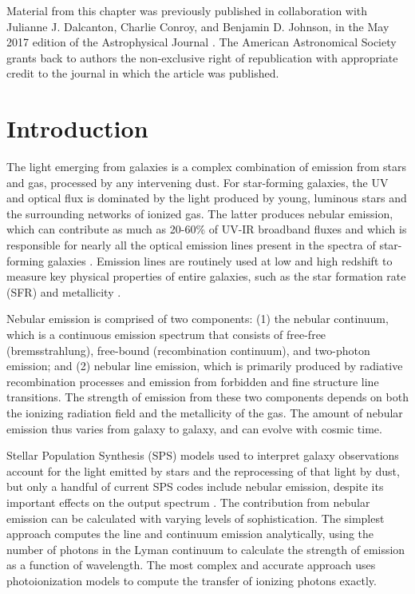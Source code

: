 Material from this chapter was previously published in collaboration with Julianne J. Dalcanton, Charlie Conroy, and Benjamin D. Johnson, in the May 2017 edition of the Astrophysical Journal \citep{Byler+2017}. The American Astronomical Society grants back to authors the non-exclusive right of republication with appropriate credit to the journal in which the article was published. 


\section{Introduction} \label{sec:introduction}

The light emerging from galaxies is a complex combination of emission from stars and gas, processed by any intervening dust. For star-forming galaxies, the UV and optical flux is dominated by the light produced by young, luminous stars and the surrounding networks of ionized gas. The latter produces nebular emission, which can contribute as much as 20-60\% of UV-IR broadband fluxes and which is responsible for nearly all the optical emission lines present in the spectra of star-forming galaxies \citep{Anders03, Reines10}. Emission lines are routinely used at low and high redshift to measure key physical properties of entire galaxies, such as the star formation rate (SFR) and metallicity \citep[e.g.,][]{Tremonti04, Kewley08}.

Nebular emission is comprised of two components: (1) the nebular continuum, which is a continuous emission spectrum that consists of free-free (bremsstrahlung), free-bound (recombination continuum), and two-photon emission; and (2) nebular line emission, which is primarily produced by radiative recombination processes and emission from forbidden and fine structure line transitions. The strength of emission from these two components depends on both the ionizing radiation field and the metallicity of the gas. The amount of nebular emission thus varies from galaxy to galaxy, and can evolve with cosmic time.

Stellar Population Synthesis (SPS) models used to interpret galaxy observations account for the light emitted by stars and the reprocessing of that light by dust, but only a handful of current SPS codes include nebular emission, despite its important effects on the output spectrum \citep[see reviews in][]{Walcher11, Conroy13}. The contribution from nebular emission can be calculated with varying levels of sophistication. The simplest approach computes the line and continuum emission analytically, using the number of photons in the Lyman continuum to calculate the strength of emission as a function of wavelength. The most complex and accurate approach uses photoionization models to compute the transfer of ionizing photons exactly.

